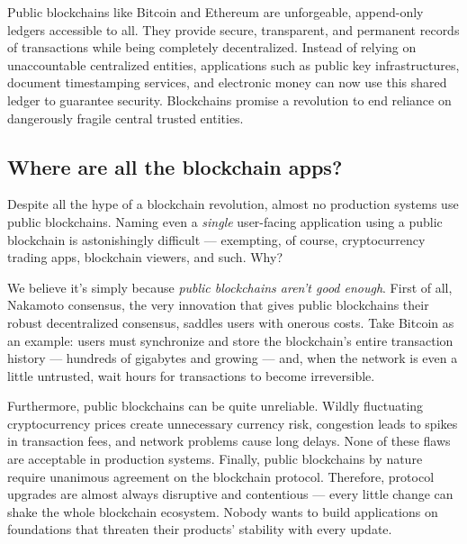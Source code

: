 \documentclass[headinclude]{scrbook}
\begin{document}
Public blockchains like Bitcoin \cite{nakamoto2008bitcoin} and Ethereum \cite{wood2014ethereum} are unforgeable, append-only ledgers accessible to all. They provide secure, transparent, and permanent records of transactions while being completely decentralized. Instead of relying on unaccountable centralized entities, applications such as public key infrastructures, document timestamping services, and electronic money can now use this shared ledger to guarantee security. Blockchains promise a revolution to end reliance on dangerously fragile central trusted entities.


\subsection{Where are all the blockchain apps?}

Despite all the hype of a blockchain revolution, almost no production systems use public blockchains. Naming even a \emph{single} user-facing application using a public blockchain is astonishingly difficult --- exempting, of course, cryptocurrency trading apps, blockchain viewers, and such. Why?

We believe it's simply because \emph{public blockchains aren't good enough}. First of all, Nakamoto consensus, the very innovation that gives public blockchains their robust decentralized consensus, saddles users with onerous costs. Take Bitcoin as an example: users must synchronize and store the blockchain's entire transaction history --- hundreds of gigabytes and growing --- and, when the network is even a little untrusted, wait hours for transactions to become irreversible.

Furthermore, public blockchains can be quite unreliable. Wildly fluctuating cryptocurrency prices create unnecessary currency risk, congestion leads to spikes in transaction fees, and network problems cause long delays. None of these flaws are acceptable in production systems. Finally, public blockchains by nature require unanimous agreement on the blockchain protocol. Therefore, protocol upgrades are almost always disruptive and contentious --- every little change can shake the whole blockchain ecosystem. Nobody wants to build applications on foundations that threaten their products' stability with every update.
\end{document}
